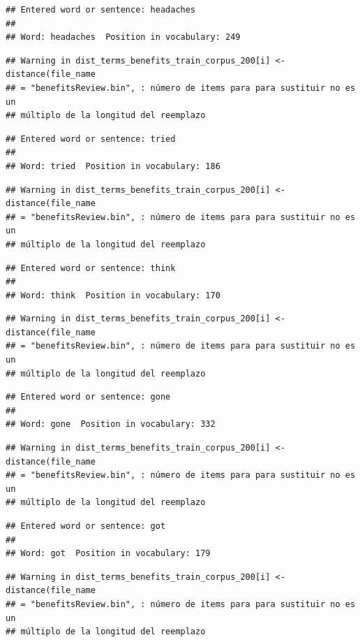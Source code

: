 \documentclass[spanish,]{article}
\begin{document}
\begin{verbatim}
## Entered word or sentence: headaches
## 
## Word: headaches  Position in vocabulary: 249
\end{verbatim}

\begin{verbatim}
## Warning in dist_terms_benefits_train_corpus_200[i] <- distance(file_name
## = "benefitsReview.bin", : número de items para para sustituir no es un
## múltiplo de la longitud del reemplazo
\end{verbatim}

\begin{verbatim}
## Entered word or sentence: tried
## 
## Word: tried  Position in vocabulary: 186
\end{verbatim}

\begin{verbatim}
## Warning in dist_terms_benefits_train_corpus_200[i] <- distance(file_name
## = "benefitsReview.bin", : número de items para para sustituir no es un
## múltiplo de la longitud del reemplazo
\end{verbatim}

\begin{verbatim}
## Entered word or sentence: think
## 
## Word: think  Position in vocabulary: 170
\end{verbatim}

\begin{verbatim}
## Warning in dist_terms_benefits_train_corpus_200[i] <- distance(file_name
## = "benefitsReview.bin", : número de items para para sustituir no es un
## múltiplo de la longitud del reemplazo
\end{verbatim}

\begin{verbatim}
## Entered word or sentence: gone
## 
## Word: gone  Position in vocabulary: 332
\end{verbatim}

\begin{verbatim}
## Warning in dist_terms_benefits_train_corpus_200[i] <- distance(file_name
## = "benefitsReview.bin", : número de items para para sustituir no es un
## múltiplo de la longitud del reemplazo
\end{verbatim}

\begin{verbatim}
## Entered word or sentence: got
## 
## Word: got  Position in vocabulary: 179
\end{verbatim}

\begin{verbatim}
## Warning in dist_terms_benefits_train_corpus_200[i] <- distance(file_name
## = "benefitsReview.bin", : número de items para para sustituir no es un
## múltiplo de la longitud del reemplazo
\end{verbatim}
\end{document}

